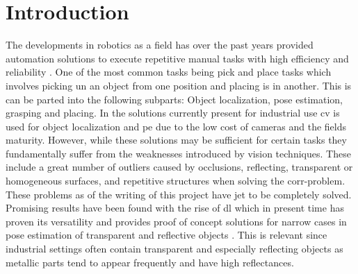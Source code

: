 \chapter{Introduction} \label{ch:intro}


The developments in robotics as a field has over the past years provided automation solutions to execute repetitive manual tasks with high efficiency and reliability \fakecite. One of the most common tasks being pick and place tasks which involves picking un an object from one position and placing is in another. This is can be parted into the following subparts: Object localization, pose estimation, grasping and placing. In the solutions currently present for industrial use \gls{cv} is used for object localization and \gls{pe} due to the low cost of cameras and the fields maturity. However, while these solutions may be sufficient for certain tasks they fundamentally suffer from the weaknesses introduced by vision techniques. These include a great number of outliers caused by occlusions, reflecting, transparent or homogeneous surfaces, and repetitive structures when solving the \gls{corr-problem}. These problems as of the writing of this project have jet to be completely solved. Promising results have been found with the rise of \gls{dl} which in present time has proven its versatility and provides proof of concept solutions for narrow cases in pose estimation of transparent \cite{6dof-pose-estimation-of-transparent-object-from-a-single-rgb-d-image} and reflective objects \cite{6d-pose-estimation-of-objects:-recent-technologies-and-challenges}. This is relevant since industrial settings often contain transparent and especially reflecting objects as metallic parts tend to appear frequently and have high reflectances. \medskip

